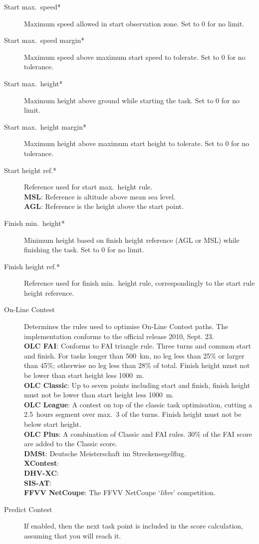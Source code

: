 \begin{description}
\item[Start max.\ speed*]  Maximum speed allowed in start observation zone.  Set
  to 0 for no limit.
\item[Start max.\ speed margin*] Maximum speed above maximum start speed to tolerate.
  Set to 0 for no tolerance.
\item[Start max.\ height*]  Maximum height above ground while starting the task.
  Set to 0 for no limit.
\item[Start max.\ height margin*]  Maximum height above maximum start height to
  tolerate.  Set to 0 for no tolerance.
\item[Start height ref.*]  Reference used for start max.\ height rule. \\
  {\bf MSL}: Reference is altitude above mean sea level. \\
  {\bf AGL}: Reference is the height above the start point.
\item[Finish min.\ height*]  Minimum height based on finish height reference
  (AGL or MSL) while finishing the task.  Set to 0 for no limit.
\item[Finish height ref.*]  Reference used for finish min.\ height rule,
  correspondingly to the start rule height reference.
\item[On-Line Contest]  Determines the rules used to optimise On-Line Contest 
  paths.  The implementation  conforms to the official release 2010, Sept. 23. \\
  {\bf OLC FAI}: Conforms to FAI triangle rule. Three turns and common start and 
  finish.  For tasks longer than
  500~km, no leg less than 25\% or larger than 45\%; otherwise no leg less than 28\%
  of total.  Finish height must not be lower than start height less 1000~m. \\
  {\bf OLC Classic}: Up to seven points including start and finish, finish height
  must not be lower than start height less 1000~m. \\
  {\bf OLC League}: A contest on top of the classic task optimisation, cutting
  a 2.5~hours segment over max.\ 3 of the turns. Finish height must not be below
  start height. \\
  {\bf OLC Plus}: A combination of Classic and FAI rules. 30\% of the FAI score
  are added to the Classic score. \\
  {\bf DMSt}: Deutsche Meisterschaft im Streckensegelflug. \\
  {\bf XContest}:  \\
  {\bf DHV-XC}:  \\
  {\bf SIS-AT}:  \\
  {\bf FFVV NetCoupe}: The FFVV NetCoupe `{\it libre}' competition.
\item[Predict Contest]  If enabled, then the next task point is included in the 
  score calculation, assuming that you will reach it.
\end{description}


